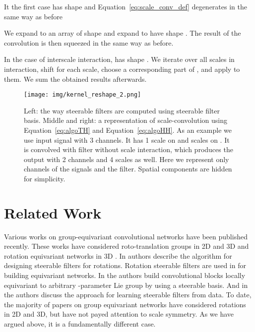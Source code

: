\documentclass{article} \usepackage{multirow}
\def\Eqref#1{Equation~\ref{#1}}
\begin{document}
It the first case  has shape  and \Eqref{eq:scale_conv_def}
degenerates in the same way as before


We expand  to an array of shape  and expand 
to have shape . The result of the convolution is then squeezed in the same way as before.

In the case of interscale interaction,  has shape . We iterate over all scales in interaction, shift  for each scale, choose a corresponding part of , and apply  to them. We sum the obtained  results afterwards.




\begin{figure}[h]
    \begin{center}
        \texttt{[image: img/kernel\_reshape\_2.png]}
    \end{center}
    \caption{Left: the way steerable filters are computed using steerable filter basis. 
        Middle and right: a representation of scale-convolution using \Eqref{eq:algoTH} and \Eqref{eq:algoHH}.
        As an example we use input signal  with 3 channels. It has 1 scale on  and  scales on .
        It is convolved with filter  without scale interaction, which produces
        the output with 2 channels and 4 scales as well. Here we represent only 
        channels of the signals and the filter. Spatial components are hidden for simplicity.
    }
    \label{fig:kernel_reshape}
\end{figure}
     \section{Related Work}
\label{sec:related}
Various works on group-equivariant convolutional networks have been published recently. 
These works have considered roto-translation groups in 2D \citet{cohen2016group,hoogeboom2018hexaconv,worrall2017harmonic,weiler2019general}
and 3D \cite{worrall2018cubenet,kondor2018n,thomas2018tensor} and rotation equivariant networks in 3D 
\citet{cohen2017convolutional,esteves2018learning,cohen2019gauge}. In \citet{freeman1991design} authors describe the 
algorithm for designing steerable filters for rotations. Rotation steerable filters are used in
\citet{cohen2016steerable,weiler20183d,weiler2018learning} for building equivariant networks. In \citet{jacobsen2017dynamic} the authors build convolutional blocks locally equivariant to arbitrary -parameter Lie group by using a steerable basis. And in \citet{muruganso} the authors discuss the approach for learning steerable filters from data.
To date, the majority of papers on group equivariant networks have considered rotations in 2D and 3D, but have not 
payed attention to scale symmetry. As we have argued above, it is a fundamentally
different case.
\end{document}

